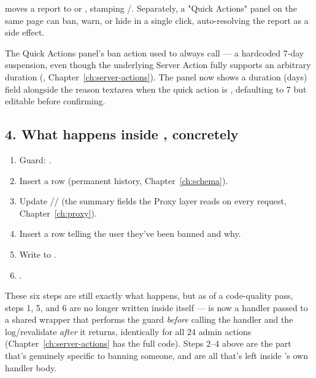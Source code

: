  moves a report to  or , stamping /. Separately, a "Quick Actions" panel on the same page can ban, warn, or hide in a single click, auto-resolving the report as a side effect.

\begin{olknote}
The Quick Actions panel's ban action used to always call  — a hardcoded 7-day suspension, even though the underlying  Server Action fully supports an arbitrary duration (, Chapter~\ref{ch:server-actions}). The panel now shows a duration (days) field alongside the reason textarea when the quick action is , defaulting to 7 but editable before confirming.
\end{olknote}

\subsection*{4. What happens inside , concretely}

\begin{enumerate}
  \item Guard: .
  \item Insert a  row (permanent history, Chapter~\ref{ch:schema}).
  \item Update // (the summary fields the Proxy layer reads on every request, Chapter~\ref{ch:proxy}).
  \item Insert a  row telling the user they've been banned and why.
  \item Write to .
  \item {}.
\end{enumerate}

These six steps are still exactly what happens, but as of a code-quality pass, steps 1, 5, and 6 are no longer written inside  itself —  is now a handler passed to a shared  wrapper that performs the guard \emph{before} calling the handler and the log/revalidate \emph{after} it returns, identically for all 24 admin actions (Chapter~\ref{ch:server-actions} has the full code). Steps 2–4 above are the part that's genuinely specific to banning someone, and are all that's left inside 's own handler body.

